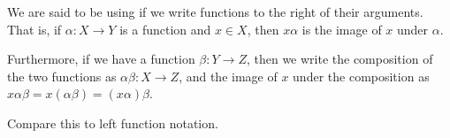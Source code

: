 \documentclass{article}
\begin{document}
We are said to be using {}
if we write functions to the right of their arguments.
That is, if $\alpha : X \to Y$ is a function and $x \in X$,
then $x \alpha$ is the image of $x$ under $\alpha$.

Furthermore, if we have a function $\beta : Y \to Z$,
then we write the composition of the two functions
as $\alpha \beta : X \to Z$,
and the image of $x$ under the composition
as $x \alpha \beta = x (\alpha \beta) = (x \alpha) \beta$.

Compare this to left function notation.
\end{document}
